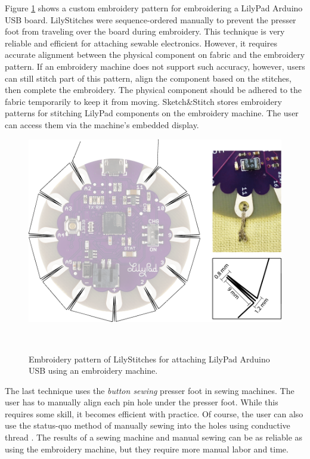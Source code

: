 \documentclass{sigchi}
\begin{document}
Figure \ref{fig:LilyStitch} shows a custom embroidery pattern for embroidering a LilyPad Arduino USB board. LilyStitches were sequence-ordered manually to prevent the presser foot from traveling over the board during embroidery. This technique is very reliable and efficient for attaching sewable electronics. However, it requires accurate alignment between the physical component on fabric and the embroidery pattern. If an embroidery machine does not support such accuracy, however, users can still stitch part of this pattern, align the component based on the stitches, then complete the embroidery. The physical component should be adhered to the fabric temporarily to keep it from moving. Sketch\&Stitch stores embroidery patterns for stitching LilyPad components on the embroidery machine. The user can access them via the machine's embedded display.

\begin{figure}
\centering
  \includegraphics[width=0.8\columnwidth]{figures/LilyStitch}
  \caption{Embroidery pattern of LilyStitches for attaching LilyPad Arduino USB using an embroidery machine.}~\label{fig:LilyStitch}
  \vspace{-2em}
\end{figure}

The last technique uses the \textit{button sewing} presser foot in sewing machines. The user has to manually align each pin hole under the presser foot. While this requires some skill, it becomes efficient with practice. Of course, the user can also use the status-quo method of manually sewing into the holes using conductive thread \cite{Buechley:2008:LAU:1357054.1357123}. 
The results of a sewing machine and manual sewing can be as reliable as using the embroidery machine, but they require more manual labor and time.
\end{document}
